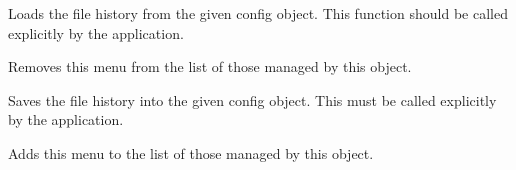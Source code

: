 Loads the file history from the given config object. This function should be called explicitly by the application.



\label{wxfilehistoryremovemenu}


Removes this menu from the list of those managed by this object.

\label{wxfilehistorysave}


Saves the file history into the given config object. This must be called
explicitly by the application.



\label{wxfilehistoryusemenu}


Adds this menu to the list of those managed by this object.


